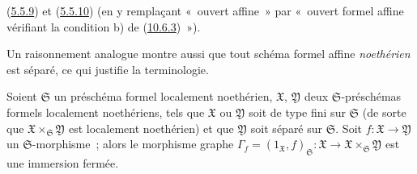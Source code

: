 (\hyperref[I.5.5.9-fr]{5.5.9}) et
(\hyperref[I.5.5.10-fr]{5.5.10}) (en y remplaçant «~ouvert affine~» par
«~ouvert formel affine vérifiant la condition b) de
(\hyperref[I.10.6.3-fr]{10.6.3})~»).

Un raisonnement analogue montre aussi que tout schéma formel affine
\emph{noethérien} est séparé, ce qui justifie la terminologie.

\begin{proposition}[10.15.4]
\label{I.10.15.4-fr}
Soient $\mathfrak{S}$ un préschéma formel localement noethérien,
$\mathfrak{X}$, $\mathfrak{Y}$ deux $\mathfrak{S}$-préschémas formels
localement noethériens, tels que $\mathfrak{X}$ ou $\mathfrak{Y}$ soit de
type fini sur $\mathfrak{S}$ (de sorte que
$\mathfrak{X}\times_{\mathfrak{S}}\mathfrak{Y}$ est localement noethérien)
et que $\mathfrak{Y}$ soit séparé sur $\mathfrak{S}$. Soit
$f:\mathfrak{X}\to\mathfrak{Y}$ un $\mathfrak{S}$-morphisme~; alors le
morphisme graphe
$\Gamma_f=(1_{\mathfrak{X}},f)_{\mathfrak{S}}:\mathfrak{X}\to
\mathfrak{X}\times_{\mathfrak{S}}\mathfrak{Y}$ est une immersion fermée.
\end{proposition}

